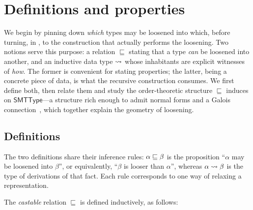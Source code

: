 \section{Definitions and properties}
\label{sec:loosening-defs}

We begin by pinning down \emph{which} types may be loosened into which, before turning, in , to the construction that actually performs the loosening. Two notions serve this purpose: a relation $\sqsubseteq$ stating that a type \emph{can} be loosened into another, and an inductive data type $ \rightsquigarrow $ whose inhabitants are explicit witnesses of \emph{how}. The former is convenient for stating properties; the latter, being a concrete piece of data, is what the recursive construction consumes. We first define both, then relate them and study the order-theoretic structure $\sqsubseteq$ induces on $\mathsf{SMTType}$---a structure rich enough to admit normal forms and a Galois connection~\cite{davey-priestley}, which together explain the geometry of loosening.

\subsection{Definitions}

The two definitions share their inference rules: $\alpha \sqsubseteq \beta$ is the proposition ``$\alpha$ may be loosened into $\beta$'', or equivalently, ``$\beta$ is looser than $\alpha$'', whereas $\alpha \rightsquigarrow \beta$ is the type of derivations of that fact. Each rule corresponds to one way of relaxing a representation.

\begin{definition}
  \label{def:castable}
  The \emph{castable} relation $\sqsubseteq$ is defined inductively, as follows:
\end{definition}

